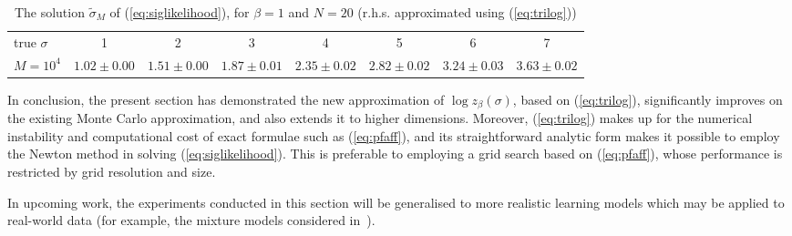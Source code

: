 \documentclass[draftclsnofoot]{IEEEtran}
\begin{document}
 \begin{table*}[h!]
 \centering
    \begin{tabular}{lccccccc}
    \hline
    true $\sigma$ & 1 & 2 & 3 & 4 & 5 & 6 & 7 \\[0.2cm]
    
   $M = 10^4$     & $ 1.02 \pm 0.00$ & $1.51 \pm 0.00$ & $1.87 \pm 0.01$ & $ 2.35 \pm 0.02$ & $ 2.82 \pm 0.02$ & $3.24 \pm 0.03$ & $3.63 \pm 0.02$ \\[0.1cm]
   \hline
 \end{tabular} 
    \caption{The solution $\tilde{\sigma}_{\scriptscriptstyle M}$ of (\ref{eq:siglikelihood}), for $\beta = 1$ and $N = 20$ (r.h.s. approximated using (\ref{eq:trilog}))}
    \label{tab:3}   
\end{table*} 

In conclusion, the present section has demonstrated the new approximation of $\log z_\beta(\sigma)$, based on (\ref{eq:trilog}), significantly improves on the existing Monte Carlo approximation, and also extends it to higher dimensions. Moreover, (\ref{eq:trilog}) makes up for the numerical instability and computational cost of exact formulae such as (\ref{eq:pfaff}), and its straightforward analytic form makes it possible to employ the Newton method in solving (\ref{eq:siglikelihood}). This is preferable to employing a grid search based on (\ref{eq:pfaff}), whose performance is restricted by grid resolution and size.  

In upcoming work, the experiments conducted in this section will be generalised to more realistic learning models which may be applied to real-world data (for example, the mixture models considered in~\cite{zanini2018}).%
\end{document}

